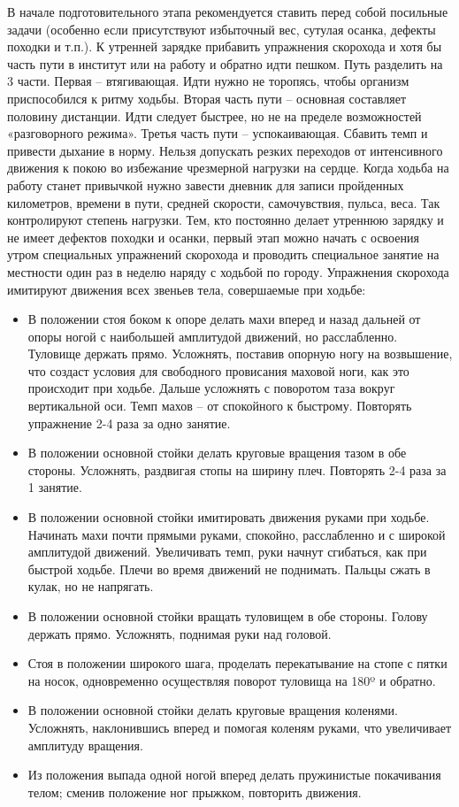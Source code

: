 \documentclass[14pt, a4paper]{article}
\begin{document}
    В начале подготовительного этапа рекомендуется ставить перед собой посильные задачи (особенно если присутствуют избыточный вес, сутулая осанка, дефекты походки и т.п.). К утренней зарядке прибавить упражнения скорохода и хотя бы часть пути в институт или на работу и обратно идти пешком. Путь разделить на 3 части. Первая – втягивающая. Идти нужно не  торопясь, чтобы организм приспособился к ритму ходьбы. Вторая часть пути – основная составляет половину дистанции. Идти следует быстрее, но не на пределе возможностей «разговорного режима». Третья часть пути – успокаивающая. Сбавить темп и привести дыхание в норму. Нельзя допускать резких переходов от интенсивного движения к покою во избежание чрезмерной нагрузки на сердце. Когда ходьба на работу станет привычкой нужно завести дневник для записи пройденных километров, времени в пути, средней скорости, самочувствия, пульса, веса. Так контролируют степень  нагрузки. Тем, кто постоянно делает утреннюю зарядку и не имеет дефектов походки и осанки, первый этап можно начать с освоения утром специальных упражнений скорохода и проводить специальное занятие на местности один раз в неделю наряду с ходьбой по городу. Упражнения скорохода имитируют движения всех звеньев тела, совершаемые при ходьбе:

    \begin{itemize}
        \item В положении стоя боком к опоре делать махи вперед и назад дальней от опоры ногой с наибольшей амплитудой движений, но расслабленно. Туловище держать прямо. Усложнять, поставив опорную ногу на возвышение, что создаст условия для свободного провисания маховой ноги, как это происходит при ходьбе. Дальше усложнять с поворотом таза вокруг вертикальной оси. Темп махов – от спокойного к быстрому. Повторять упражнение 2-4 раза за одно занятие.
        \item В положении основной стойки делать круговые вращения тазом в обе стороны. Усложнять, раздвигая стопы на ширину плеч. Повторять 2-4 раза за 1 занятие.
        \item В положении основной стойки имитировать движения руками при ходьбе. Начинать махи почти прямыми руками, спокойно, расслабленно и с широкой амплитудой движений. Увеличивать темп, руки начнут сгибаться, как при быстрой ходьбе. Плечи во время движений не поднимать. Пальцы сжать в кулак, но не напрягать.
        \item В положении основной стойки вращать туловищем в обе стороны. Голову держать прямо. Усложнять, поднимая руки над головой.
        \item Стоя в положении широкого шага, проделать перекатывание на стопе с пятки на носок, одновременно осуществляя поворот туловища на 180º и обратно.
        \item В положении основной стойки делать круговые вращения коленями. Усложнять, наклонившись вперед и помогая коленям руками, что увеличивает амплитуду вращения.
        \item Из положения выпада одной ногой вперед делать пружинистые покачивания телом; сменив положение ног прыжком, повторить движения.
    \end{itemize}
\end{document}
